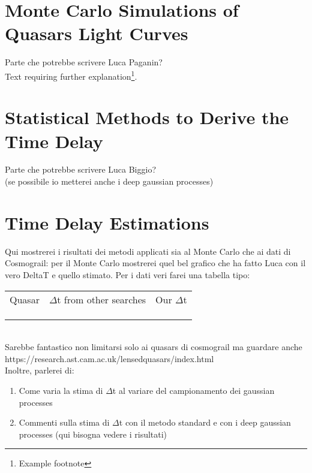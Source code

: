 \documentclass[twoside,twocolumn]{article}
\begin{document}

\section{Monte Carlo Simulations of Quasars Light Curves}

Parte che potrebbe scrivere Luca Paganin?
\\
Text requiring further explanation\footnote{Example footnote}.


\section{Statistical Methods to Derive the Time Delay}

Parte che potrebbe scrivere Luca Biggio?
\\
(se possibile io metterei anche i deep gaussian processes)



\section{Time Delay Estimations}
 
 Qui mostrerei i risultati dei metodi applicati sia al Monte Carlo che ai dati di Cosmograil: per il Monte Carlo mostrerei quel bel grafico che ha fatto Luca con il vero DeltaT e quello stimato. Per i dati veri farei una tabella tipo:
 \begin{table}[h]
 	\begin{tabular}{c|c|c}
 	Quasar	& $\Delta$t from other searches &  Our $\Delta$t  \\
 		&  &    \\
 		&  &  \\
 		&  & 
 	\end{tabular}
 \end{table}
\\
Sarebbe fantastico non limitarsi solo ai quasars di cosmograil ma guardare anche https://research.ast.cam.ac.uk/lensedquasars/index.html
\\
Inoltre, parlerei di: 
\begin{enumerate}
	\item Come varia la stima di $\Delta$t al variare del campionamento dei gaussian processes
	\item Commenti sulla stima di $\Delta$t con il metodo standard e con i deep gaussian processes (qui bisogna vedere i risultati)
\end{enumerate} 
\end{document}
